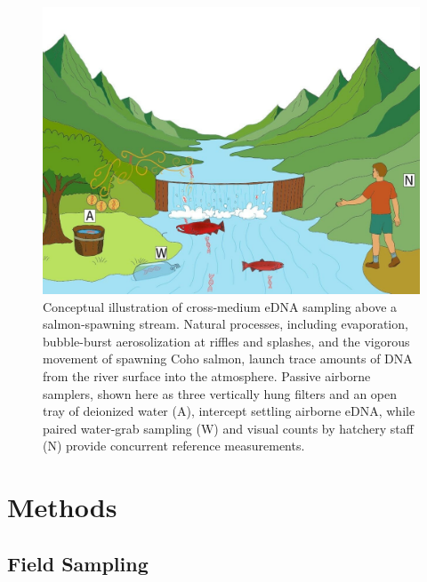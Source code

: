 \documentclass{article}
\begin{document}
\begin{figure}[tbhp] 
\centering
\includegraphics[width=13.5cm]{20250525_figure_conceptual_coloured.jpg}  
\caption{Conceptual illustration of cross‐medium eDNA sampling above a salmon‐spawning stream. Natural processes, including evaporation, bubble-burst aerosolization at riffles and splashes, and the vigorous movement of spawning Coho salmon, launch trace amounts of DNA from the river surface into the atmosphere. Passive airborne samplers, shown here as three vertically hung filters and an open tray of deionized water (A), intercept settling airborne eDNA, while paired water-grab sampling (W) and visual counts by hatchery staff (N) provide concurrent reference measurements.}
\label{fig:AI_physical_model}
\end{figure}

\section{Methods}

\subsection{Field Sampling}
\end{document}
